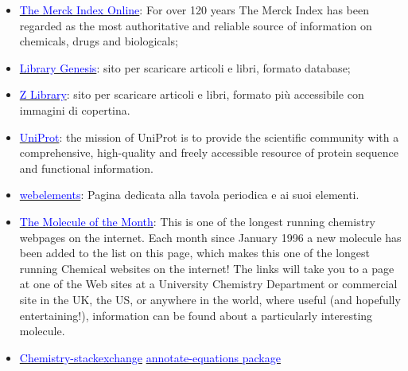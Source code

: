 \begin{footnotesize}
\begin{multicols}{2}
\begin{itemize}
    \item \href{https://www.rsc.org/merck-index}{\textcolor{blue}{The Merck Index Online}}: For over 120 years The Merck Index has been regarded as the most authoritative and reliable source of information on chemicals, drugs and biologicals;
    \item \href{http://libgen.is/}{\textcolor{blue}{Library Genesis}}: sito per scaricare articoli e libri, formato database;
    \item \href{https://it.z-lib.org/}{\textcolor{blue}{Z Library}}: sito per scaricare articoli e libri, formato più accessibile con immagini di copertina.
    \item \href{https://www.uniprot.org/}{\textcolor{blue}{UniProt}}: the mission of UniProt is to provide the scientific community with a comprehensive, high-quality and freely accessible resource of protein sequence and functional information.
    \item \href{https://www.webelements.com/}{\textcolor{blue}{webelements}}: Pagina dedicata alla tavola periodica e ai suoi elementi.
    \item  \href{http://www.chm.bris.ac.uk/motm/motm.htm}{\textcolor{blue}{The Molecule of the Month}}: This is one of the longest running chemistry webpages on the internet. Each month since January 1996 a new molecule has been added to the list on this page, which makes this one of the longest running Chemical websites on the internet! The links will take you to a page at one of the Web sites at a University Chemistry Department or commercial site in the UK, the US, or anywhere in the world, where useful (and hopefully entertaining!), information can be found about a particularly interesting molecule.
    \item \href{https://chemistry.stackexchange.com/}{\textcolor{blue}{Chemistry-stackexchange}}
    \iterm \href{https://ctan.org/pkg/annotate-equations}{\textcolor{blue}{annotate-equations package}}
\end{itemize}
\end{multicols}
\end{footnotesize}